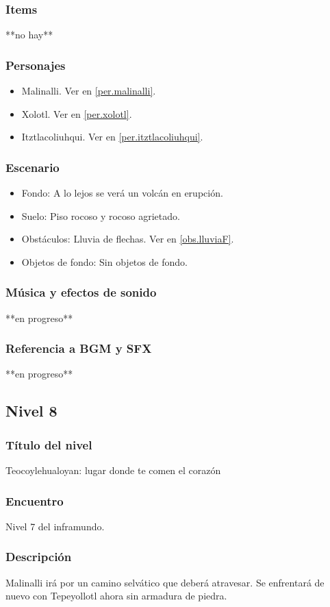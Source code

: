 \documentclass[11pt,letterpaper]{article}
\begin{document}
	\subsubsection{Items}
	**no hay**
	\subsubsection{Personajes}
	\begin{itemize}
		\item Malinalli. Ver en \ref{per.malinalli}.
		\item Xolotl. Ver en \ref{per.xolotl}.
		\item Itztlacoliuhqui. Ver en \ref{per.itztlacoliuhqui}.
	\end{itemize}
	\subsubsection{Escenario}
\begin{itemize} 
	\item Fondo: A lo lejos se verá un volcán en erupción.
	\item Suelo: Piso rocoso y rocoso agrietado.
	\item Obstáculos: Lluvia de flechas. Ver en \ref{obs.lluviaF}.
	\item Objetos de fondo: Sin objetos de fondo.
\end{itemize}	
	\subsubsection{Música y efectos de sonido}
	**en progreso**
	\subsubsection{Referencia a BGM y SFX}
	**en progreso**
	
	
		\subsection{Nivel 8}
	\subsubsection{Título del nivel}
	Teocoylehualoyan: lugar donde te comen el corazón
	\subsubsection{Encuentro}
	Nivel 7 del inframundo.
	\subsubsection{Descripción}
	Malinalli irá por un camino selvático que deberá atravesar. Se enfrentará de nuevo con Tepeyollotl ahora sin armadura de piedra.
\end{document}
